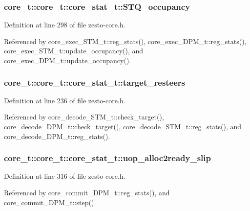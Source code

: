 \subsubsection[{STQ\_\-occupancy}]{ core\_\-t::core\_\-t::core\_\-stat\_\-t::STQ\_\-occupancy}\label{structcore__t_1_1core__stat__t_f3d2158ddddc0b2516fa0ffb92a21aad}




Definition at line 298 of file zesto-core.h.

Referenced by core\_\-exec\_\-STM\_\-t::reg\_\-stats(), core\_\-exec\_\-DPM\_\-t::reg\_\-stats(), core\_\-exec\_\-STM\_\-t::update\_\-occupancy(), and core\_\-exec\_\-DPM\_\-t::update\_\-occupancy().
\subsubsection[{target\_\-resteers}]{ core\_\-t::core\_\-t::core\_\-stat\_\-t::target\_\-resteers}\label{structcore__t_1_1core__stat__t_20714a7001e308cba48cd7ee46430f9d}




Definition at line 236 of file zesto-core.h.

Referenced by core\_\-decode\_\-STM\_\-t::check\_\-target(), core\_\-decode\_\-DPM\_\-t::check\_\-target(), core\_\-decode\_\-STM\_\-t::reg\_\-stats(), and core\_\-decode\_\-DPM\_\-t::reg\_\-stats().
\subsubsection[{uop\_\-alloc2ready\_\-slip}]{ core\_\-t::core\_\-t::core\_\-stat\_\-t::uop\_\-alloc2ready\_\-slip}\label{structcore__t_1_1core__stat__t_2558608f59a0d6feeb4ca9b7c0a56ad9}




Definition at line 316 of file zesto-core.h.

Referenced by core\_\-commit\_\-DPM\_\-t::reg\_\-stats(), and core\_\-commit\_\-DPM\_\-t::step().

